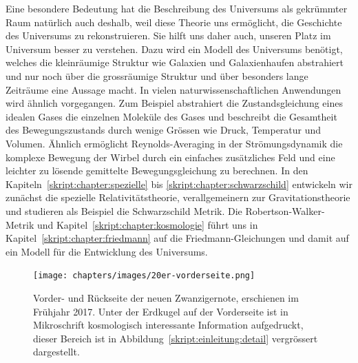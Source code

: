 Eine besondere Bedeutung hat die Beschreibung des Universums als gekrümmter
Raum natürlich auch deshalb, weil diese Theorie uns ermöglicht,
die Geschichte des Universums zu rekonstruieren.
Sie hilft uns daher auch, unseren Platz im Universum besser zu
verstehen.
Dazu wird ein Modell des Universums benötigt, welches die kleinräumige
Struktur wie Galaxien und Galaxienhaufen abstrahiert und nur noch
über die grossräumige Struktur und über besonders lange Zeiträume
eine Aussage macht.
In vielen naturwissenschaftlichen Anwendungen wird ähnlich vorgegangen.
Zum Beispiel abstrahiert die Zustandsgleichung eines idealen Gases
die einzelnen Moleküle des Gases und beschreibt die Gesamtheit des
Bewegungszustands durch wenige Grössen wie Druck, Temperatur und Volumen.
Ähnlich ermöglicht Reynolds-Averaging in der Strömungsdynamik die 
komplexe Bewegung der Wirbel durch ein einfaches zusätzliches Feld und
eine leichter zu lösende gemittelte Bewegungsgleichung zu berechnen.
In den Kapiteln~\ref{skript:chapter:spezielle}
bis \ref{skript:chapter:schwarzschild} entwickeln wir zunächst die spezielle
Relativitätstheorie, verallgemeinern zur Gravitationstheorie
und studieren als Beispiel die Schwarzschild Metrik.
Die Robertson-Walker-Metrik und Kapitel~\ref{skript:chapter:kosmologie}
führt uns in Kapitel~\ref{skript:chapter:friedmann} auf die
Friedmann-Gleichungen und damit auf ein Modell für die Entwicklung des
Universums.

\begin{figure}
\centering
\texttt{[image: chapters/images/20er-vorderseite.png]}
\caption{Vorder- und Rückseite der neuen Zwanzigernote, erschienen
im Frühjahr 2017.
Unter der Erdkugel auf der Vorderseite ist in Mikroschrift kosmologisch
interessante Information aufgedruckt, dieser Bereich ist in
Abbildung~\ref{skript:einleitung:detail} vergrössert dargestellt.
\label{skript:einleitung:noten}}
\end{figure}

